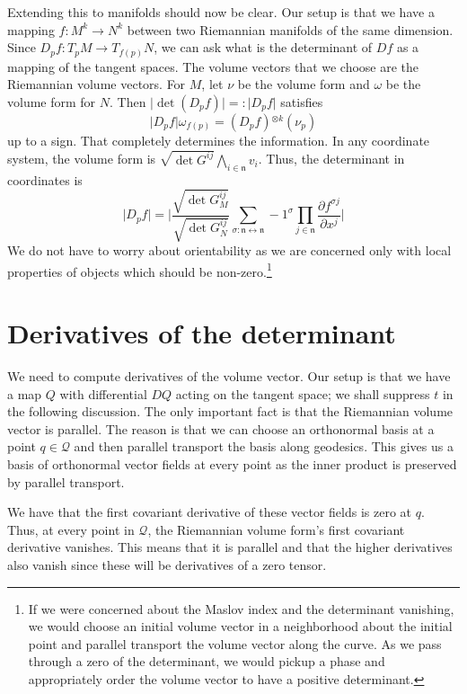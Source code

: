 \documentclass[11pt]{article}
\theoremstyle{remark}
\begin{document}
Extending this to manifolds should now be clear. 
Our setup is that we have a mapping $f: M^k \to N^k$ between two
Riemannian manifolds of the same dimension. 
Since $D_pf : T_pM \to T_{f(p)}N$, we can ask what is the
determinant of $Df$ as a mapping of the tangent spaces. The volume
vectors that we choose are the Riemannian volume vectors. For $M$, let
$\nu$ be the volume form and $\omega$ be the volume form for $N$. Then
$\ensuremath{\lvert {\det(D_pf)} \rvert} \ensuremath{=:} \ensuremath{\lvert {D_pf} \rvert} $   satisfies
\[
\ensuremath{\lvert {D_pf} \rvert} \omega_{f(p)} =( D_pf )\ensuremath{^{\otimes k} } (\nu_p)
\]
up to a sign.
That
completely determines the information. In any coordinate system, the
volume form is $\sqrt{\det G^{ij}} \bigwedge_{i \in \ensuremath{\mathfrak{n}}} v_i$.  Thus, the
determinant in coordinates is
\[
\ensuremath{\lvert {D_pf} \rvert} = \ensuremath{\lvert {\frac{\sqrt{\det{G_M^{ij}}}}{\sqrt{\det{G_N^{ij}}}} 
\sum_{\sigma : \ensuremath{\mathfrak{n}} \leftrightarrow \ensuremath{\mathfrak{n}}} -1^\sigma
\prod_{j \in \ensuremath{\mathfrak{n}}} \ensuremath{\frac{\partial {f^{\sigma j} }}{\partial {x^j}}} } \rvert}
\]
We do not have to worry about orientability as we are concerned only
with local properties of objects which should be non-zero.\footnote{If 
we were concerned about the Maslov index and the
determinant vanishing, we would choose an initial volume vector in a
neighborhood about the initial point and
parallel transport the volume vector along the curve. As we pass through
a zero of the determinant, we would pickup a phase and appropriately
order the volume vector to have a positive determinant.}


\section{Derivatives of the determinant}

We need to compute derivatives of the volume vector. Our setup is that
we have a map $Q$ with differential $DQ$ acting on the tangent
space; we shall suppress $t$ in the following discussion. 
The only important fact is that the Riemannian 
volume vector is parallel. The reason is that we can choose an
orthonormal basis at a point $q \in \ensuremath{\mathcal{Q}}$ and then parallel
transport the basis along geodesics. This gives us a basis of
orthonormal vector fields at every point as the inner product is
preserved by parallel transport. 


We have that  the first covariant derivative of these
vector fields is zero at $q$. Thus, at every point in \ensuremath{\mathcal{Q}}, the Riemannian
volume form's first covariant derivative vanishes. This means that it
is parallel and that the higher derivatives also vanish since these
will be derivatives of a zero tensor.
\end{document}
